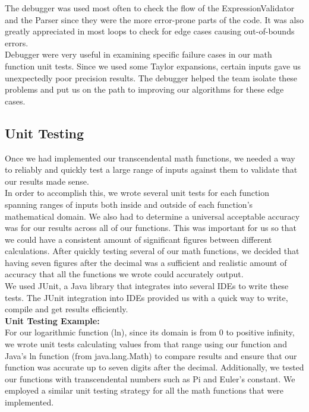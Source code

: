 \documentclass[a4paper, 12pt]{article}
\begin{document}
The debugger was used most often to check the flow of the ExpressionValidator and the Parser since they were the more error-prone parts of the code. It was also greatly appreciated in most loops to check for edge cases causing out-of-bounds errors.
\\

Debugger were very useful in examining specific failure cases in our math function unit tests. Since we used some Taylor expansions, certain inputs gave us unexpectedly poor precision results. The debugger helped the team isolate these problems and put us on the path to improving our algorithms for these edge cases.

\subsection{Unit Testing}

Once we had implemented our transcendental math functions, we needed a way to reliably and quickly test a large range of inputs against them to validate that our results made sense.  
\\

In order to accomplish this, we wrote several unit tests for each function spanning ranges of inputs both inside and outside of each function’s mathematical domain. We also had to determine a universal acceptable accuracy was for our results across all of our functions. This was important for us so that we could have a consistent amount of significant figures between different calculations. After quickly testing several of our math functions, we decided that having seven figures after the decimal was a sufficient and realistic amount of accuracy that all the functions we wrote could accurately output.
\\

We used JUnit, a Java library that integrates into several IDEs to write these tests. The JUnit integration into IDEs provided us with a quick way to write, compile and get results efficiently.
\\

\textbf{Unit Testing Example:}
\\
For our logarithmic function (ln), since its domain is from 0 to positive infinity, we wrote unit tests calculating values from that range using our function and Java’s ln function (from java.lang.Math) to compare results and ensure that our function was accurate up to seven digits after the decimal. Additionally, we tested our functions with transcendental numbers such as Pi and Euler’s constant. We employed a similar unit testing strategy for all the math functions that were implemented.
\end{document}
